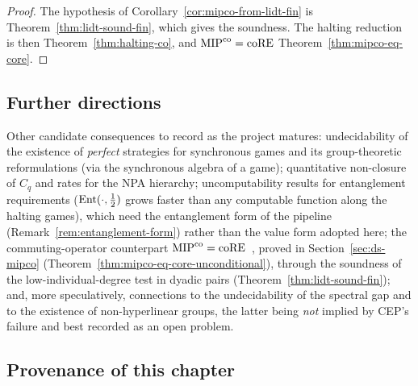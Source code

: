 \begin{proof}
\leanok
The hypothesis of Corollary~\ref{cor:mipco-from-lidt-fin} is Theorem~\ref{thm:lidt-sound-fin},
which gives the soundness. The halting reduction is then Theorem~\ref{thm:halting-co}, and
$\mathrm{MIP}^{\mathrm{co}} = \mathrm{coRE}$ Theorem~\ref{thm:mipco-eq-core}.
\end{proof}

\subsection{Further directions}

\begin{remark}
\label{rem:further}
Other candidate consequences to record as the project matures: undecidability of the
existence of \emph{perfect} strategies for synchronous games and its group-theoretic
reformulations (via the synchronous algebra of a game); quantitative non-closure of
$C_q$ and rates for the NPA hierarchy; uncomputability results for entanglement
requirements ($\mathrm{Ent}(\cdot, \frac12)$ grows faster than any computable function along
the halting games), which need the entanglement form of the pipeline
(Remark~\ref{rem:entanglement-form}) rather than the value form adopted here; the
commuting-operator counterpart $\mathrm{MIP}^{\mathrm{co}} = \mathrm{coRE}$~\cite{Lin23,Lin25}, proved in
Section~\ref{sec:ds-mipco} (Theorem~\ref{thm:mipco-eq-core-unconditional}), through the soundness
of the low-individual-degree test in dyadic pairs (Theorem~\ref{thm:lidt-sound-fin}); and, more speculatively,
connections
to the undecidability of the spectral gap and to the existence of non-hyperlinear
groups, the latter being \emph{not} implied by CEP's failure and best recorded as an
open problem.
\end{remark}

\subsection{Provenance of this chapter}


